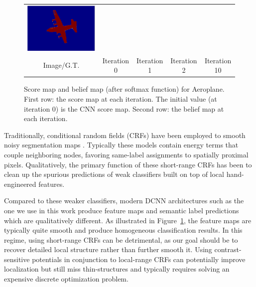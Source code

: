 \begin{figure}[ht]
\begin{tabular}{c c c c c}
    \includegraphics[width=0.16\linewidth]{fig/mean_field_illustration/Belief_Class1_Itr10.pdf} \\
    Image/G.T. & Iteration 0 & Iteration 1 & Iteration 2 & Iteration 10 \\
  \end{tabular}
  \caption{Score map and belief map (after softmax function) for Aeroplane. First row: the score map at each iteration. The initial value (at iteration 0) is the CNN score map. Second row: the belief map at each iteration. 
    }
  \label{fig:score-maps}
\end{figure}

Traditionally, conditional random fields (CRFs) have been employed to smooth
noisy segmentation maps \cite{rother2004grabcut, kohli2009robust}. Typically
these models contain energy terms that couple neighboring nodes, favoring
same-label assignments to spatially proximal pixels. Qualitatively, the
primary function of these short-range CRFs has been to clean up the spurious
predictions of weak classifiers built on top of local hand-engineered features.

Compared to these weaker classifiers, modern DCNN architectures such as
the one we use in this work produce feature maps and semantic label
predictions which are qualitatively different. As illustrated in
Figure~\ref{fig:score-maps}, the feature maps are typically quite smooth and
produce homogeneous classification results. In this regime, using short-range
CRFs can be detrimental, as our goal should be to recover detailed local
structure rather than further smooth it. Using contrast-sensitive potentials
\cite{rother2004grabcut} in conjunction to local-range CRFs can potentially
improve localization but still miss thin-structures and typically requires
solving an expensive discrete optimization problem.


